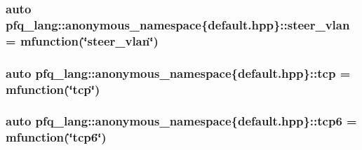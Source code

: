 \hypertarget{namespacepfq__lang_1_1anonymous__namespace_02default_8hpp_03_ad32804252244d5b572b9f5fe0cdda675}{
\subsubsection[{steer\+\_\+vlan}]{\setlength{\rightskip}{0pt plus 5cm}auto pfq\+\_\+lang\+::anonymous\+\_\+namespace\{default.\+hpp\}\+::steer\+\_\+vlan = {\bf mfunction}(\char`\"{}steer\+\_\+vlan\char`\"{})}}\label{namespacepfq__lang_1_1anonymous__namespace_02default_8hpp_03_ad32804252244d5b572b9f5fe0cdda675}
\hypertarget{namespacepfq__lang_1_1anonymous__namespace_02default_8hpp_03_a4046140746c0012b4d1ea8d3ef53f084}{
\subsubsection[{tcp}]{\setlength{\rightskip}{0pt plus 5cm}auto pfq\+\_\+lang\+::anonymous\+\_\+namespace\{default.\+hpp\}\+::tcp = {\bf mfunction}(\char`\"{}tcp\char`\"{})}}\label{namespacepfq__lang_1_1anonymous__namespace_02default_8hpp_03_a4046140746c0012b4d1ea8d3ef53f084}
\hypertarget{namespacepfq__lang_1_1anonymous__namespace_02default_8hpp_03_a734af11014e5ccaef77d6fa39cea0d6b}{
\subsubsection[{tcp6}]{\setlength{\rightskip}{0pt plus 5cm}auto pfq\+\_\+lang\+::anonymous\+\_\+namespace\{default.\+hpp\}\+::tcp6 = {\bf mfunction}(\char`\"{}tcp6\char`\"{})}}\label{namespacepfq__lang_1_1anonymous__namespace_02default_8hpp_03_a734af11014e5ccaef77d6fa39cea0d6b}
